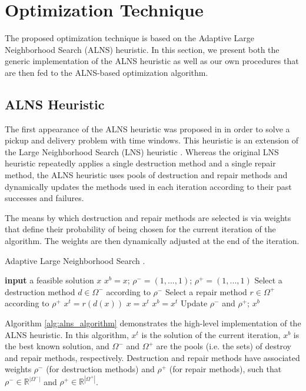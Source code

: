 \documentclass[conference]{IEEEtran}
\begin{document}
\section{Optimization Technique}

The proposed optimization technique is based on the Adaptive Large Neighborhood Search (ALNS) heuristic. In this section, we present both the generic implementation of the ALNS heuristic as well as our own procedures that are then fed to the ALNS-based optimization algorithm.

\subsection{ALNS Heuristic}

The first appearance of the ALNS heuristic was proposed in \cite{ALNS_paper} in order to solve a pickup and delivery problem with time windows. This heuristic is an extension of the Large Neighborhood Search (LNS) heuristic \cite{LNS_paper}. Whereas the original LNS heuristic repeatedly applies a single destruction method and a single repair method, the ALNS heuristic uses pools of destruction and repair methods and dynamically updates the methods used in each iteration according to their past successes and failures.

The means by which destruction and repair methods are selected is via weights that define their probability of being chosen for the current iteration of the algorithm. The weights are then dynamically adjusted at the end of the iteration\cite{ALNS_book}.

\begin{algorithm}[htp]
\caption{Adaptive Large Neighborhood Search \cite{ALNS_book}.}
\label{alg:alns_algorithm}
\begin{algorithmic}[1]
\State \textbf{input} a feasible solution $x$
\State $x^b = x$; $\rho^- = (1,...,1)$; $\rho^+ = (1,...,1)$
\Repeat
    \State Select a destruction method $d \in \Omega^-$ according to $\rho^-$
    \State Select a repair method $r \in \Omega^+$ according to $\rho^+$
    \State $x^t = r(d(x))$
        \State $x=x^t$
    \EndIf
        \State $x^b = x^t$
    \EndIf
    \State Update $\rho^-$ and $\rho^+$;
\State \Return $x^b$
\end{algorithmic}
\end{algorithm}

\pagebreak
Algorithm \ref{alg:alns_algorithm} demonstrates the high-level implementation of the ALNS heuristic. In this algorithm, $x^t$ is the solution of the current iteration, $x^b$ is the best known solution, and $\Omega^-$ and $\Omega^+$ are the pools (i.e. the sets) of destroy and repair methods, respectively. Destruction and repair methods have associated weights $\rho^-$ (for destruction methods) and $\rho^+$ (for repair methods), such that $\rho^- \in \mathbb{R}^{|\Omega^-|}$ and $\rho^+ \in \mathbb{R}^{|\Omega^+|}$.
\end{document}
